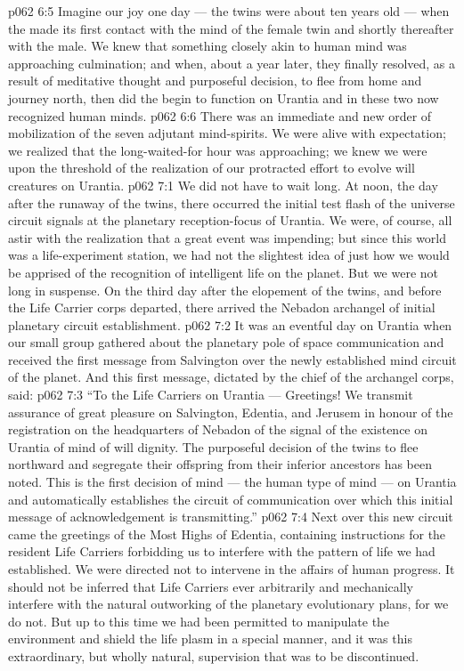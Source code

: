\vs p062 6:5 Imagine our joy one day --- the twins were about ten years old --- when the  made its first contact with the mind of the female twin and shortly thereafter with the male. We knew that something closely akin to human mind was approaching culmination; and when, about a year later, they finally resolved, as a result of meditative thought and purposeful decision, to flee from home and journey north, then did the  begin to function on Urantia and in these two now recognized human minds.
\vs p062 6:6 There was an immediate and new order of mobilization of the seven adjutant mind\hyp{}spirits. We were alive with expectation; we realized that the long\hyp{}waited\hyp{}for hour was approaching; we knew we were upon the threshold of the realization of our protracted effort to evolve will creatures on Urantia.
\vs p062 7:1 We did not have to wait long. At noon, the day after the runaway of the twins, there occurred the initial test flash of the universe circuit signals at the planetary reception\hyp{}focus of Urantia. We were, of course, all astir with the realization that a great event was impending; but since this world was a life\hyp{}experiment station, we had not the slightest idea of just how we would be apprised of the recognition of intelligent life on the planet. But we were not long in suspense. On the third day after the elopement of the twins, and before the Life Carrier corps departed, there arrived the Nebadon archangel of initial planetary circuit establishment.
\vs p062 7:2 It was an eventful day on Urantia when our small group gathered about the planetary pole of space communication and received the first message from Salvington over the newly established mind circuit of the planet. And this first message, dictated by the chief of the archangel corps, said:
\vs p062 7:3 “To the Life Carriers on Urantia --- Greetings! We transmit assurance of great pleasure on Salvington, Edentia, and Jerusem in honour of the registration on the headquarters of Nebadon of the signal of the existence on Urantia of mind of will dignity. The purposeful decision of the twins to flee northward and segregate their offspring from their inferior ancestors has been noted. This is the first decision of mind --- the human type of mind --- on Urantia and automatically establishes the circuit of communication over which this initial message of acknowledgement is transmitting.”
\vs p062 7:4 Next over this new circuit came the greetings of the Most Highs of Edentia, containing instructions for the resident Life Carriers forbidding us to interfere with the pattern of life we had established. We were directed not to intervene in the affairs of human progress. It should not be inferred that Life Carriers ever arbitrarily and mechanically interfere with the natural outworking of the planetary evolutionary plans, for we do not. But up to this time we had been permitted to manipulate the environment and shield the life plasm in a special manner, and it was this extraordinary, but wholly natural, supervision that was to be discontinued.
